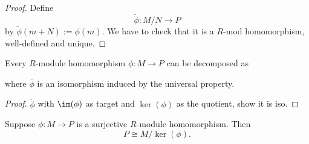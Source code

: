 \begin{proof}
    Define \[
    \widetilde{\phi}: M / N \to P
    \]  by $\widetilde{\phi} (m+N):=\phi(m)$. We have to check that it is a $R$-mod homomorphism, well-defined and unique.
\end{proof}
\begin{theorem}
    Every $R$-module homomorphism $\phi: M \to P$ can be decomposed as 
    \begin{figure}[H]
        \centering
    \end{figure}
    where $\overline{\phi}$ is an isomorphism induced by the universal property.
\end{theorem}
\begin{proof}
    $\widetilde{\phi}$ with $\im(\phi)$ as target and $\ker(\phi)$ as the quotient, show it is iso.
\end{proof}
\begin{corollary}
    Suppose $\phi: M \to P$ is a surjective $R$-module homomorphism. Then \[
    P \cong M / \ker(\phi)
    .\] 
\end{corollary}
